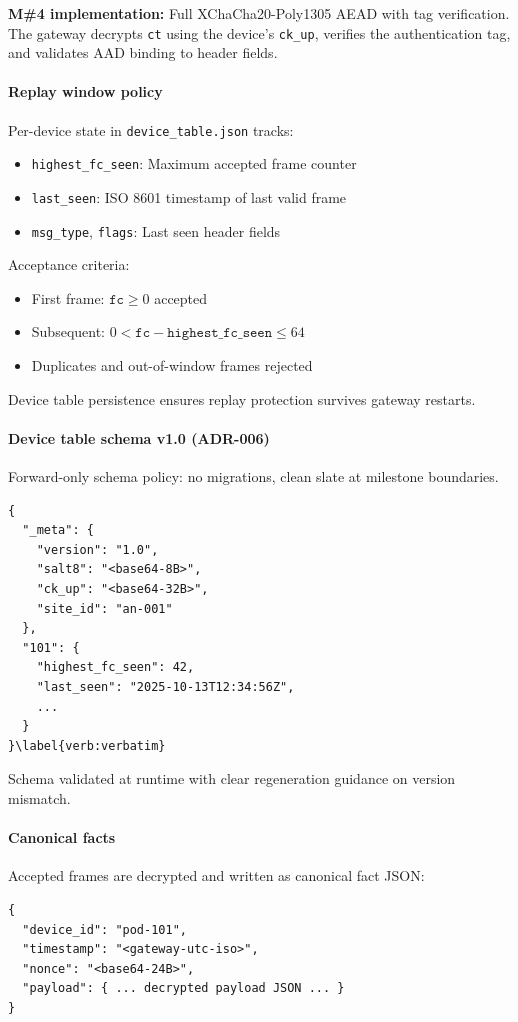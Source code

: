 \textbf{M\#4 implementation:} Full XChaCha20-Poly1305 AEAD with tag verification.
The gateway decrypts \texttt{ct} using the device's \texttt{ck\_up}, verifies the authentication tag, and validates AAD binding to header fields.

\paragraph{Replay window policy}
Per-device state in \texttt{device\_table.json} tracks:
\begin{itemize}[nosep]
    \item \texttt{highest\_fc\_seen}: Maximum accepted frame counter
    \item \texttt{last\_seen}: ISO 8601 timestamp of last valid frame
    \item \texttt{msg\_type}, \texttt{flags}: Last seen header fields
\end{itemize}

Acceptance criteria:
\begin{itemize}[nosep]
    \item First frame: $\texttt{fc} \ge 0$ accepted
    \item Subsequent: $0 < \texttt{fc} - \texttt{highest\_fc\_seen} \le 64$
    \item Duplicates and out-of-window frames rejected
\end{itemize}

Device table persistence ensures replay protection survives gateway restarts.

\paragraph{Device table schema v1.0 (ADR-006)}
Forward-only schema policy: no migrations, clean slate at milestone boundaries.
\begin{verbatim}
{
  "_meta": {
    "version": "1.0",
    "salt8": "<base64-8B>",
    "ck_up": "<base64-32B>",
    "site_id": "an-001"
  },
  "101": {
    "highest_fc_seen": 42,
    "last_seen": "2025-10-13T12:34:56Z",
    ...
  }
}\label{verb:verbatim}
\end{verbatim}

Schema validated at runtime with clear regeneration guidance on version mismatch.

\paragraph{Canonical facts}
Accepted frames are decrypted and written as canonical fact JSON:
\begin{verbatim}
{
  "device_id": "pod-101",
  "timestamp": "<gateway-utc-iso>",
  "nonce": "<base64-24B>",
  "payload": { ... decrypted payload JSON ... }
}
\end{verbatim}

